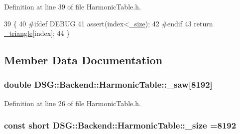 Definition at line 39 of file Harmonic\+Table.\+h.


\begin{DoxyCode}
39                                                                                \{
40 \textcolor{preprocessor}{#ifdef DEBUG}
41             assert(index<\hyperlink{classDSG_1_1Backend_1_1HarmonicTable_a478d8f277438567c219780d3bd372566}{\_size});
42 \textcolor{preprocessor}{#endif}
43             \textcolor{keywordflow}{return} \hyperlink{classDSG_1_1Backend_1_1HarmonicTable_a70d00f8d0ad9a244ebf4a8784a69ec33}{\_triangle}[index];
44         \}
\end{DoxyCode}


\subsection{Member Data Documentation}
\hypertarget{classDSG_1_1Backend_1_1HarmonicTable_ad5d0c429c75e41c83c098fcab28cfb8c}{
\subsubsection[{\+\_\+saw}]{\setlength{\rightskip}{0pt plus 5cm}double D\+S\+G\+::\+Backend\+::\+Harmonic\+Table\+::\+\_\+saw\mbox{[}8192\mbox{]}\hspace{0.3cm}{\ttfamily [protected]}}}\label{classDSG_1_1Backend_1_1HarmonicTable_ad5d0c429c75e41c83c098fcab28cfb8c}


Definition at line 26 of file Harmonic\+Table.\+h.

\hypertarget{classDSG_1_1Backend_1_1HarmonicTable_a478d8f277438567c219780d3bd372566}{
\subsubsection[{\+\_\+size}]{\setlength{\rightskip}{0pt plus 5cm}const short D\+S\+G\+::\+Backend\+::\+Harmonic\+Table\+::\+\_\+size =8192\hspace{0.3cm}{\ttfamily [protected]}}}\label{classDSG_1_1Backend_1_1HarmonicTable_a478d8f277438567c219780d3bd372566}


